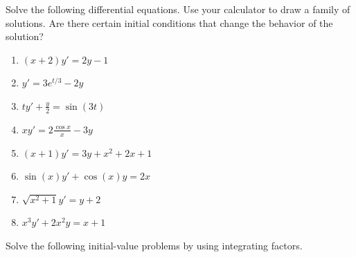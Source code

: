 \documentclass{exercises}
\begin{document}
Solve the following differential equations. Use your calculator to draw a family of solutions. Are there certain initial conditions that change the behavior of the solution?

\begin{enumerate}[resume]
\item \techrequired $(x+2)y'=2y-1$
\item \techrequired $y'=3e^{t/3}-2y$
\item \techrequired $ty'+\frac{y}{2}=\sin(3t)$
\item \techrequired $xy'=2\frac{\cos x}{x}-3y$
\item \techrequired $(x+1)y'=3y+x^{2}+2x+1$
\item \techrequired $\sin(x)y'+\cos(x)y=2x$
\item \techrequired $\sqrt{x^{2}+1}y'=y+2$
\item \techrequired $x^{3}y'+2x^{2}y=x+1$
\end{enumerate}

Solve the following initial-value problems by using integrating factors.
\end{document}
